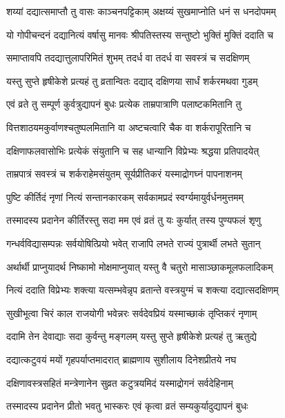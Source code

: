 \twolineshloka
{शय्यां दद्यात्समाप्तौ तु वासः काञ्चनपट्टिकाम्}
{अक्षय्यं सुखमाप्नोति धनं स धनदोपमम्} %

\twolineshloka
{यो गोपीचन्दनं दद्यानित्यं वर्षासु मानवः}
{श्रीपतिस्तस्य सन्तुष्टो भुक्तिं मुक्तिं ददाति च} %

\twolineshloka
{समाप्तावपि तदद्यात्तुलापरिमितं शुभम्}
{तदर्ध वा तदर्ध वा सवस्त्रं च सदक्षिणम्} %

\twolineshloka
{यस्तु सुप्ते हृषीकेशे प्रत्यहं तु व्रतान्वितः}
{दद्याद् दक्षिणया सार्धं शर्करमथवा गुडम्} %

\twolineshloka
{एवं व्रते तु सम्पूर्ण कुर्वत्रुद्यापनं बुधः}
{प्रत्येक ताम्रपात्राणि पलाष्टकमितानि तु} %

\twolineshloka
{वित्तशाठयमकुर्वाणश्चतुष्पलमितानि वा}
{अष्टचत्वारि चैक वा शर्करापूरितानि च} %

\twolineshloka
{दक्षिणाफलवासोभिः प्रत्येकं संयुतानि च}
{सह धान्यानि विप्रेभ्यः श्रद्धया प्रतिपादयेत्} %

\twolineshloka
{ताम्रपात्रं सवस्त्रं च शर्कराहेमसंयुतम्}
{सूर्यप्रीतिकरं यस्माद्रोगघ्नं पापनाशनम्} %

\twolineshloka
{पुष्टि कीर्तिदं नृणां नित्यं सन्तानकारकम्}
{सर्वकामप्रदं स्वर्ग्यमायुर्वर्धनमुत्तमम्} %

\twolineshloka
{तस्मादस्य प्रदानेन कीर्तिरस्तु सदा मम}
{एवं व्रतं तु यः कुर्यात् तस्य पुण्यफलं शृणु} %

\twolineshloka
{गन्धर्वविद्यासम्पन्नः सर्वयोषित्प्रियो भवेत्}
{राजापि लभते राज्यं पुत्रार्थी लभते सुतान्} %

\twolineshloka
{अर्थार्थी प्राप्नुयादर्थ निष्कामो मोक्षमाप्नुयात्}
{यस्तु वै चतुरो मासाञ्छाकमूलफलादिकम्} %

\twolineshloka
{नित्यं ददाति विप्रेभ्यः शक्त्या यत्सम्भवेन्नृप}
{व्रतान्ते वस्त्रयुग्मं च शक्त्या दद्यात्सदक्षिणम्} %

\twolineshloka
{सुखीभूत्वा चिरं काल राजयोगी भवेन्नरः}
{सर्वदेवप्रियं यस्माच्छाकं तृप्तिकरं नृणाम्} %

\twolineshloka
{ददामि तेन देवाद्याः सदा कुर्वन्तु मङ्गलम्}
{यस्तु सुप्ते हृषीकेशे प्रत्यहं तु ऋतुद्ये} %

\twolineshloka
{दद्यात्कटुवयं मयों गृहपर्याप्तमादरात्}
{ब्राह्मणाय सुशीलाय दिनेशप्रीतये नघ} %

\twolineshloka
{दक्षिणावस्त्रसहितं मन्त्रेणानेन सुव्रत}
{कटुत्रयमिदं यस्माद्रोगनं सर्वदेहिनाम्} %

\twolineshloka
{तस्मादस्य प्रदानेन प्रीतो भवतु भास्करः}
{एवं कृत्वा व्रतं सम्यकुर्यादुद्यापनं बुधः} %

